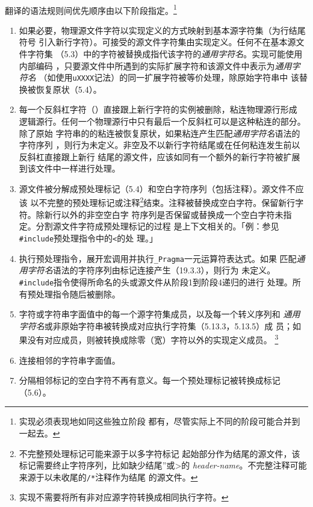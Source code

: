 \paragraph{}
翻译的语法规则间优先顺序由以下阶段指定。\footnote{实现必须表现地如同这些独立阶段
都有，尽管实际上不同的阶段可能合并到一起去。}
\begin{enumerate}[label={\arabic*}]
  \item{如果必要，物理源文件字符以实现定义的方式映射到基本源字符集（为行结尾符号
    引入新行字符）。可接受的源文件字符集由实现定义。任何不在基本源文件字符集
   （5.3）中的字符被替换成指代该字符的\textit{通用字符名}。实现可能使用内部编码
    ，只要源文件中所遇到的实际扩展字符和该源文件中表示为\textit{通用字符名}
    （如使用\texttt{\bslh uXXXX}记法）的同一扩展字符被等价处理，除原始字符串中
    该替换被恢复原状（5.4）。}
  \item{每一个反斜杠字符（\bslh）直接跟上新行字符的实例被删除，粘连物理源行形成
    逻辑源行。任何一个物理源行中只有最后一个反斜杠可以是这种粘连的部分。除了原始
    字符串的的粘连被恢复原状，如果粘连产生匹配\textit{通用字符名}语法的字符序列
    ，则行为未定义。非空及不以新行字符结尾或在任何粘连发生前以反斜杠直接跟上新行
    结尾的源文件，应该如同有一个额外的新行字符被扩展到该文件中一样进行处理。}
  \item{源文件被分解成预处理标记（5.4）和空白字符序列（包括注释）。源文件不应该
    以不完整的预处理标记或注释\footnote{不完整预处理标记可能来源于以多字符标记
    起始部分作为结尾的源文件，该标记需要终止字符序列，比如缺少结尾”或>的
    \textit{header-name}。不完整注释可能来源于以未收尾的\texttt{/*}注释作为结尾
    的源文件。}结束。注释被替换成空白字符。保留新行字符。除新行以外的非空空白字
    符序列是否保留或替换成一个空白字符未指定。分割源文件字符成预处理标记的过程
    是上下文相关的。「例：参见\texttt{\#include}预处理指令中的\texttt{<}的处
    理。」}
  \item{执行预处理指令，展开宏调用并执行\texttt{\_Pragma}一元运算符表达式。如果
    匹配\textit{通用字符名}语法的字符序列由标记连接产生（19.3.3），则行为
    未定义。\texttt{\#include}指令使得所命名的头或源文件从阶段1到阶段4递归的进行
    处理。所有预处理指令随后被删除。}
  \item{字符或字符串字面值中的每一个源字符集成员，以及每一个转义序列和
    \textit{通用字符名}或非原始字符串被转换成对应执行字符集（5.13.3，5.13.5）成
    员；如果没有对应成员，则被转换成除零（宽）字符以外的实现定义成员。
    \footnote{实现不需要将所有非对应源字符转换成相同执行字符。}}
  \item{连接相邻的字符串字面值。}
  \item{分隔相邻标记的空白字符不再有意义。每一个预处理标记被转换成标记（5.6）。
}
\end{enumerate}
